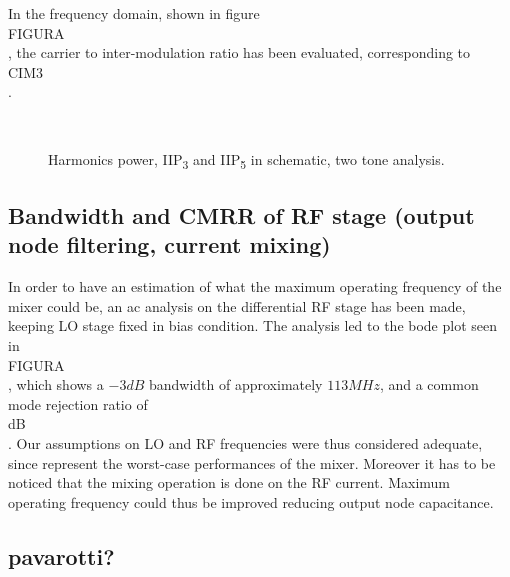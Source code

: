 In the frequency domain, shown in figure \\FIGURA\\, the carrier to inter-modulation ratio has been evaluated, corresponding to \\CIM3\\.

\begin{figure}[H] 
	\centering
	 \\
	\caption{Harmonics power, IIP\textsubscript{3} and IIP\textsubscript{5} in schematic, two tone analysis.}
	\label{fig:IIP3_2t_schem}
\end{figure}


\subsection{Bandwidth and CMRR of RF stage (output node filtering, current mixing)}
In order to have an estimation of what the maximum operating frequency of the mixer could be, an ac analysis on the differential RF stage has been made, keeping LO stage fixed in bias condition. The analysis led to the bode plot seen in \\FIGURA\\, which shows a \(-3dB\) bandwidth of approximately \(113MHz\), and a common mode rejection ratio of \\dB\\. Our assumptions on LO and RF frequencies were thus considered adequate, since represent the worst-case performances of the mixer. Moreover it has to be noticed that the mixing operation is done on the RF current. Maximum operating frequency could thus be improved reducing output node capacitance. 
\subsection{pavarotti?}
